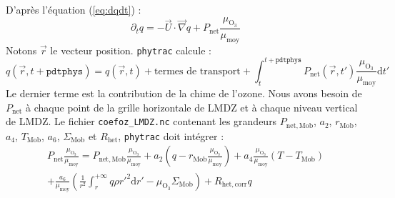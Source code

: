 \documentclass[a4paper,english,french]{article}
\newcommand{\ud}{\mathrm{d}}
\begin{document}
D'après l'équation (\ref{eq:dqdt}) :
\begin{displaymath}
  \partial_t q
  = - \vec U \cdot \vec\nabla q
  + P_\mathrm{net} \frac{\mu_{\mathrm{O}_3}}{\mu_\mathrm{moy}}
\end{displaymath}
Notons $\vec r$ le vecteur position. \verb+phytrac+ calcule :
\begin{displaymath}
  q(\vec r, t + \mathtt{pdtphys}) = q(\vec r, t) + \textrm{termes de transport}
  + \int_t ^{t + \mathtt{pdtphys}} P_\mathrm{net}(\vec r, t')
  \frac{\mu_{\mathrm{O}_3}}{\mu_\mathrm{moy}} \ud t'
\end{displaymath}
Le dernier terme est la contribution de la chime de l'ozone. Nous
avons besoin de $P_\mathrm{net}$ à chaque point de la grille
horizontale de LMDZ et à chaque niveau vertical de LMDZ. Le fichier
\verb+coefoz_LMDZ.nc+ contenant les grandeurs $P_\mathrm{net,Mob}$,
$a_2$, $r_\mathrm{Mob}$, $a_4$, $T _\mathrm{Mob}$, $a_6$,
$\Sigma_\mathrm{Mob}$ et $R_\mathrm{het}$, \verb+phytrac+ doit
intégrer :
\begin{multline*}
  P_\mathrm{net} \frac{\mu_{\mathrm{O}_3}}{\mu_\mathrm{moy}}
  = P_\mathrm{net,Mob} \frac{\mu_{\mathrm{O}_3}}{\mu_\mathrm{moy}}
  + a_2 \left(q - r_\mathrm{Mob} \frac{\mu_{\mathrm{O}_3}}{\mu_\mathrm{moy}}\right)
  + a_4 \frac{\mu_{\mathrm{O}_3}}{\mu_\mathrm{moy}}
  (T - T_\mathrm{Mob}) \\
  + \frac{a_6}{\mu_\mathrm{moy}}
  \left(
    \frac{1}{r^2} \int_r ^{+ \infty} q \rho r'^2 \ud r'
    - \mu_{\mathrm{O}_3} \Sigma_\mathrm{Mob}
  \right)
  + R_\mathrm{het,corr} q
\end{multline*}
\end{document}
